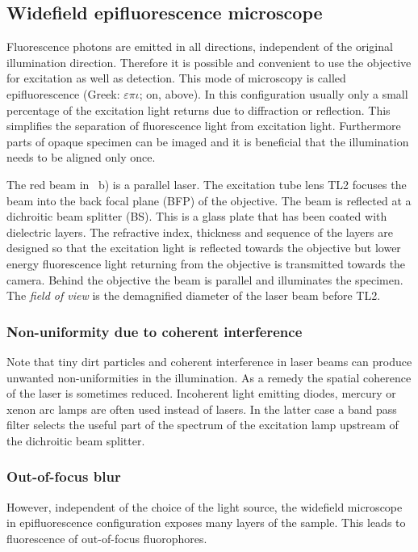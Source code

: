 \subsection{Widefield epifluorescence microscope}
Fluorescence photons are emitted in all directions, independent of the
original illumination direction. Therefore it is possible and
convenient to use the objective for excitation as well as
detection. This mode of microscopy is called epifluorescence (Greek:
$\varepsilon\pi\iota$; on, above).  In this configuration usually only
a small percentage of the excitation light returns due to diffraction
or reflection. This simplifies the separation of fluorescence light
from excitation light.  Furthermore parts of opaque specimen can be
imaged and it is beneficial that the illumination needs to be aligned
only once.


The red beam in ~b) is a parallel
laser. The excitation tube lens TL2 focuses the beam into the back
focal plane (BFP) of the objective. The beam is reflected at a
dichroitic beam splitter (BS). This is a glass plate that has been
coated with dielectric layers. The refractive index, thickness and
sequence of the layers are designed so that the excitation light is
reflected towards the objective but lower energy fluorescence light
returning from the objective is transmitted towards the camera. Behind
the objective the beam is parallel and illuminates the specimen. The
\emph{field of view} is the demagnified diameter of the laser beam
before TL2.
\subsubsection*{Non-uniformity due to coherent interference}
Note that tiny dirt particles and coherent interference in laser beams
can produce unwanted non-uniformities in the illumination. As a remedy
the spatial coherence of the laser is sometimes reduced.  Incoherent
light emitting diodes, mercury or xenon arc lamps are often used
instead of lasers. In the latter case a band pass filter selects the
useful part of the spectrum of the excitation lamp upstream of the
dichroitic beam splitter.

\subsubsection{Out-of-focus blur}
However, independent of the choice of the light source, the widefield
microscope in epifluorescence configuration exposes many layers of the
sample. This leads to fluorescence of out-of-focus fluorophores.

